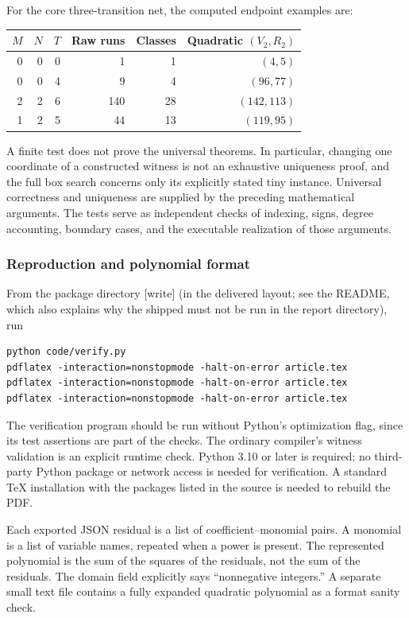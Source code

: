 \documentclass[11pt,a4paper]{article}
\theoremstyle{definition}
\theoremstyle{remark}
\newcommand{\wtag}{\textup{[write]}}%
\begin{document}
For the core three-transition net, the computed endpoint examples are:
\begin{center}
\begin{tabular}{@{}rrrrrr@{}}
\toprule
$M$ & $N$ & $T$ & Raw runs & Classes & Quadratic $(V_2,R_2)$\\
\midrule
0&0&0&1&1&$(4,5)$\\
0&0&4&9&4&$(96,77)$\\
2&2&6&140&28&$(142,113)$\\
1&2&5&44&13&$(119,95)$\\
\bottomrule
\end{tabular}
\end{center}

A finite test does not prove the universal theorems. In particular, changing one coordinate of a constructed witness is not an exhaustive uniqueness proof, and the full box search concerns only its explicitly stated tiny instance. Universal correctness and uniqueness are supplied by the preceding mathematical arguments. The tests serve as independent checks of indexing, signs, degree accounting, boundary cases, and the executable realization of those arguments.

\subsubsection{Reproduction and polynomial format}
From the package directory \wtag{} (in the delivered layout; see the README, which also explains why the shipped  must not be run in the report directory), run
\begin{lstlisting}
python code/verify.py
pdflatex -interaction=nonstopmode -halt-on-error article.tex
pdflatex -interaction=nonstopmode -halt-on-error article.tex
pdflatex -interaction=nonstopmode -halt-on-error article.tex
\end{lstlisting}
The verification program should be run without Python's optimization flag, since its test assertions are part of the checks. The ordinary compiler's witness validation is an explicit runtime check. Python 3.10 or later is required; no third-party Python package or network access is needed for verification. A standard TeX installation with the packages listed in the source is needed to rebuild the PDF.

Each exported JSON residual is a list of coefficient--monomial pairs. A monomial is a list of variable names, repeated when a power is present. The represented polynomial is the sum of the squares of the residuals, not the sum of the residuals. The domain field explicitly says ``nonnegative integers.'' A separate small text file contains a fully expanded quadratic polynomial as a format sanity check.
\end{document}
